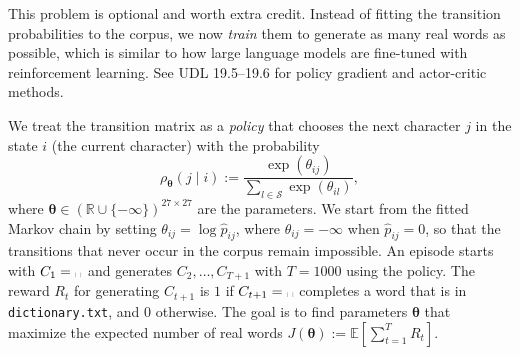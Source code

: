 \documentclass[letterpaper]{article}
\newcommand{\Real}{\mathbb{R}}
\newcommand{\spc}{\text{\textvisiblespace}}
\begin{document}
This problem is optional and worth extra credit. Instead of fitting the transition probabilities to the corpus, we now \emph{train} them to generate as many real words as possible, which is similar to how large language models are fine-tuned with reinforcement learning. See UDL 19.5--19.6 for policy gradient and actor-critic methods.

We treat the transition matrix as a \emph{policy} that chooses the next character $j$ in the state $i$ (the current character) with the probability
\[
  \rho_{\bm{\theta}}(j \mid i) := \frac{\exp(\theta_{ij})}{\sum_{l \in \mathcal{S}} \exp(\theta_{il})},
\]
where $\bm{\theta} \in (\Real \cup \{-\infty\})^{27\times 27}$ are the parameters. We start from the fitted Markov chain by setting $\theta_{ij} = \log \hat{p}_{ij}$, where $\theta_{ij} = -\infty$ when $\hat{p}_{ij} = 0$, so that the transitions that never occur in the corpus remain impossible. An episode starts with $C_1 = \spc$ and generates $C_2, \dots, C_{T+1}$ with $T = 1000$ using the policy. The reward $R_t$ for generating $C_{t+1}$ is $1$ if $C_{t+1} = \spc$ completes a word that is in \texttt{dictionary.txt}, and $0$ otherwise. The goal is to find parameters $\bm{\theta}$ that maximize the expected number of real words $J(\bm{\theta}) := \mathbb{E}\left[\sum_{t=1}^T R_t\right]$.
\end{document}
